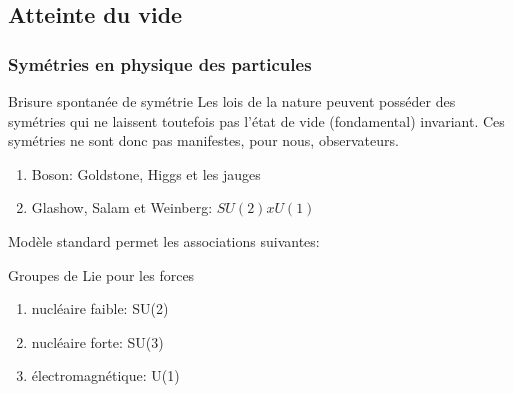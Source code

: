 \documentclass[handout]{beamer}
\begin{document}
\subsection{Atteinte du vide}
\begin{frame}
\frametitle{Symétries en physique des particules}
\begin{block}{Brisure spontanée de symétrie}
Les lois de la nature peuvent posséder des symétries qui ne laissent toutefois pas l'état de vide (fondamental) invariant. Ces symétries ne sont donc pas manifestes, pour nous, observateurs.
\begin{enumerate}
\item Boson: Goldstone, Higgs et les jauges
\item Glashow, Salam et Weinberg: $SU(2)xU(1)$ 
\end{enumerate}
\end{block}
Modèle standard permet les associations suivantes:
\begin{block}{Groupes de Lie pour les forces}
\begin{enumerate}
\item nucléaire faible: SU(2)
\item nucléaire forte: SU(3)
\item électromagnétique: U(1)
\end{enumerate}
\end{block}
\end{frame}
\end{document}
